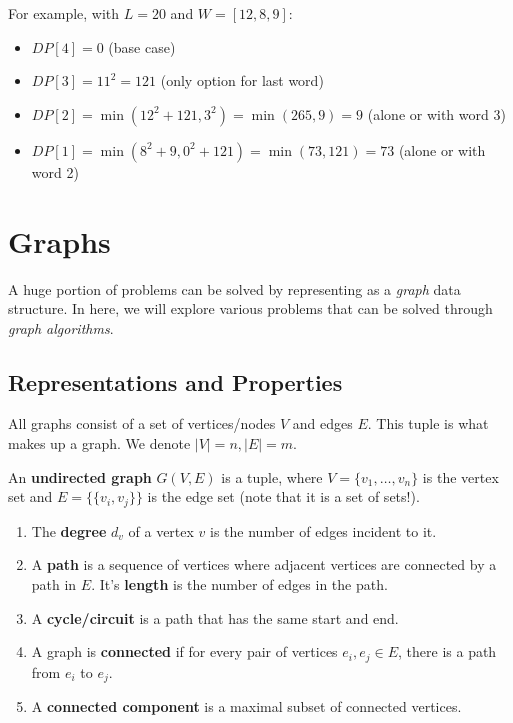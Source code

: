 \documentclass{article}
\begin{document}
    \begin{example}
      For example, with $L=20$ and $W=[12,8,9]$:
      \begin{itemize}
        \item $DP[4] = 0$ (base case)
        \item $DP[3] = 11^2 = 121$ (only option for last word)
        \item $DP[2] = \min(12^2 + 121, 3^2) = \min(265, 9) = 9$ (alone or with word 3)
        \item $DP[1] = \min(8^2 + 9, 0^2 + 121) = \min(73, 121) = 73$ (alone or with word 2)
      \end{itemize}
    \end{example}

\section{Graphs}

    A huge portion of problems can be solved by representing as a \textit{graph} data structure. In here, we will explore various problems that can be solved through \textit{graph algorithms}. 

  \subsection{Representations and Properties}

    All graphs consist of a set of vertices/nodes $V$ and edges $E$. This tuple is what makes up a graph. We denote $|V| = n, |E| = m$. 

    \begin{definition}
      An \textbf{undirected graph} $G(V, E)$ is a tuple, where $V = \{v_1, \ldots, v_n\}$ is the vertex set and $E = \{\{v_i, v_j\}\}$ is the edge set (note that it is a set of sets!). 
      \begin{enumerate}
        \item The \textbf{degree} $d_v$ of a vertex $v$ is the number of edges incident to it. 
        \item A \textbf{path} is a sequence of vertices where adjacent vertices are connected by a path in $E$. It's \textbf{length} is the number of edges in the path. 
        \item A \textbf{cycle/circuit} is a path that has the same start and end. 
        \item A graph is \textbf{connected} if for every pair of vertices $e_i, e_j \in E$, there is a path from $e_i$ to $e_j$. 
        \item A \textbf{connected component} is a maximal subset of connected vertices. 
      \end{enumerate}
    \end{definition}
\end{document}

